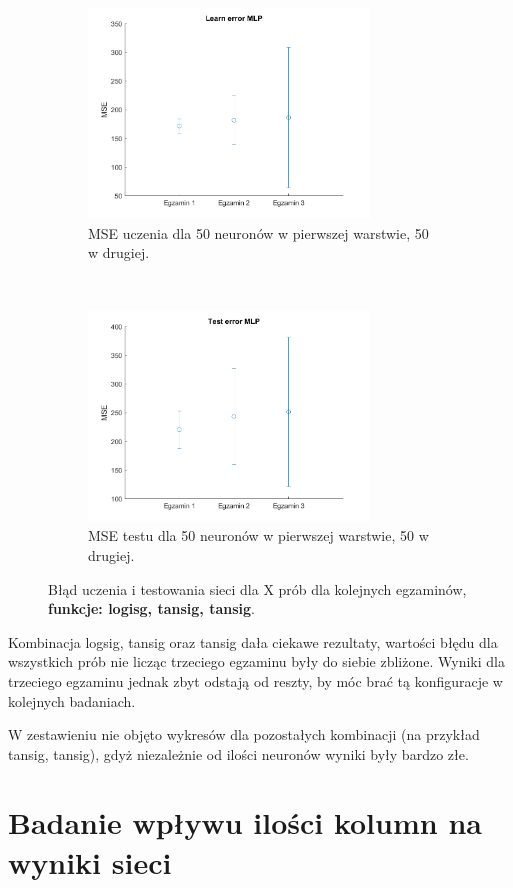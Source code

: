 \documentclass[12pt]{article}
\begin{document}
\begin{figure}[H]
\begin{subfigure}[t]{0.48\textwidth} 
\centering
\includegraphics[height=2.2in]{logsig_tansig_tansig50_learn.png}
\caption{MSE uczenia dla  50 neuronów w pierwszej warstwie, 50 w drugiej.}
\end{subfigure}
~~
\begin{subfigure}[t]{0.48\textwidth} 
\centering
\includegraphics[height=2.2in]{logsig_tansig_tansig50_test.png}
\caption{MSE testu dla 50 neuronów w pierwszej warstwie, 50 w drugiej.}
\end{subfigure}

\caption{Błąd uczenia i testowania sieci dla X prób dla kolejnych egzaminów, \textbf{funkcje: logisg, tansig, tansig}.}
\end{figure}

Kombinacja logsig, tansig oraz tansig dała ciekawe rezultaty, wartości błędu dla wszystkich prób nie licząc trzeciego egzaminu były do siebie zbliżone. Wyniki dla trzeciego egzaminu jednak zbyt odstają od reszty, by móc brać tą konfiguracje w kolejnych badaniach.

W zestawieniu nie objęto wykresów dla pozostałych kombinacji (na przykład tansig, tansig),  gdyż niezależnie od ilości neuronów wyniki były bardzo złe.


\pagebreak
\section{Badanie wpływu ilości kolumn na wyniki sieci}
\end{document}
